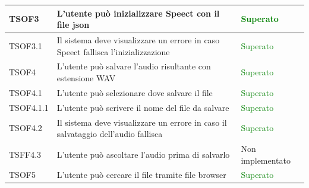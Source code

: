 \documentclass[openany,12pt,a4paper]{report}
\begin{document}
\begin{longtable}{| p{2cm} |p{8cm} | p{2.5cm} |}
	\newline TSOF3&		
	\newline L'utente può inizializzare Speect con il file json&
	\newline \textcolor{green}{Superato}
	\\[1em]	
	\hline	
	
	\newline TSOF3.1&
	\newline Il sistema deve visualizzare un errore in caso Speect fallisca l'inizializzazione&
	\newline \textcolor{green}{Superato}
	\\[1em]		
	\hline
	
	\newline TSOF4&
	\newline L'utente può salvare l'audio risultante con estensione WAV&
	\newline \textcolor{green}{Superato}
	\\[1em]
	\hline
	
	\newline TSOF4.1&
	\newline L'utente può selezionare dove salvare il file&
	\newline \textcolor{green}{Superato}
	\\[1em]
	
	\hline	
	\newline TSOF4.1.1&
	\newline L'utente può scrivere il nome del file da salvare&
	\newline \textcolor{green}{Superato}
	\\[1em]
	
	\hline
	\newline TSOF4.2&
	\newline Il sistema deve visualizzare un errore in caso il salvataggio dell'audio fallisca&
	\newline \textcolor{green}{Superato}
	\\[1em]
	\hline
	
	\newline TSFF4.3&
	\newline L'utente può ascoltare l'audio prima di salvarlo&
	\newline Non implementato
	\\[1em]
	\hline
	
	\newline TSOF5&
	\newline L'utente può cercare il file tramite file browser&
	\newline \textcolor{green}{Superato}
	\\[1em]
	\hline
	

\end{longtable}
\end{document}
